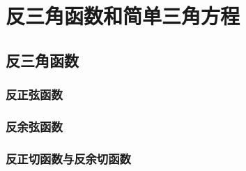 \chapter{反三角函数和简单三角方程}
\section{反三角函数}
\subsection{反正弦函数}
\begin{Practice}
  \begin{question}
    \item 
    \item 
    \item 
    \item 
    \item 
    \item 
    \item 
  \end{question}
\end{Practice}
\subsection{反余弦函数}
\begin{Practice}
  \begin{question}
    \item 
    \item 
    \item 
    \item 
    \item 
    \item 
  \end{question}
\end{Practice}

\subsection{反正切函数与反余切函数}
\begin{Practice}
  \begin{question}
    \item 
    \item 
    \item 
    \item 
    \item 
  \end{question}
\end{Practice}

